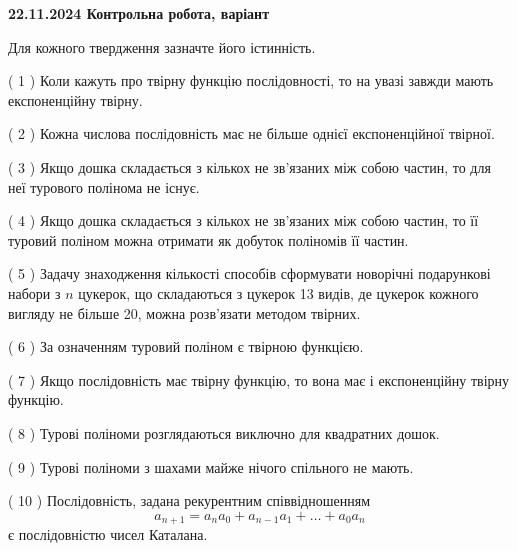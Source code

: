 \documentclass[12pt, ukrainian]{article}
\begin{document}
\vspace{4mm}
\newpage
\begin {large}

\textbf{22.11.2024 Контрольна робота, варіант  }\par


{
Для кожного твердження зазначте його істинність.\par
\vspace{2mm}
( 1 ) Коли кажуть про твірну функцію послідовності, то на увазі завжди мають експоненційну твірну.%

( 2 ) Кожна числова послідовність має не більше однієї  експоненційної твірної.%

( 3 ) Якщо дошка складається з кількох не зв’язаних між собою частин, то для неї турового полінома не існує.%

( 4 ) Якщо дошка складається з кількох не зв’язаних між собою частин, то її туровий поліном можна отримати як добуток поліномів її частин.%

( 5 ) Задачу знаходження кількості способів сформувати новорічні подарункові набори з $n$ цукерок, що складаються з цукерок 13 видів, де цукерок кожного вигляду не більше 20, можна розв’язати методом твірних.%

( 6 ) За означенням туровий поліном є твірною функцією.%

( 7 ) Якщо послідовність має твірну функцію, то вона має і експоненційну твірну функцію.%

( 8 ) Турові поліноми розглядаються виключно для квадратних дошок.%

( 9 ) Турові поліноми з шахами майже нічого спільного не мають.%

( 10 ) Послідовність, задана рекурентним співвідношенням $$a_{n+1}=a_{n}a_{0}+a_{n-1}a_{1}+\ldots+a_0a_{n}$$ є послідовністю чисел Каталана.%


\vspace{5mm}
}
\end {large}
\end{document}

